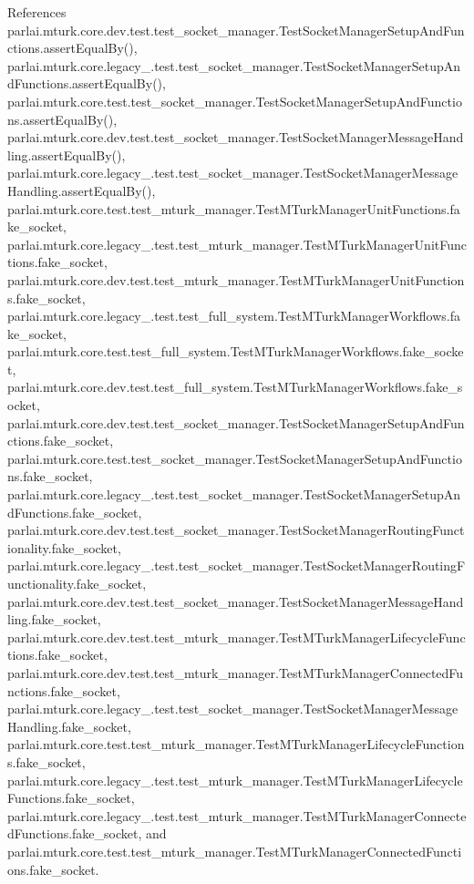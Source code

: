 References parlai.\+mturk.\+core.\+dev.\+test.\+test\+\_\+socket\+\_\+manager.\+Test\+Socket\+Manager\+Setup\+And\+Functions.\+assert\+Equal\+By(), parlai.\+mturk.\+core.\+legacy\+\_.\+test.\+test\+\_\+socket\+\_\+manager.\+Test\+Socket\+Manager\+Setup\+And\+Functions.\+assert\+Equal\+By(), parlai.\+mturk.\+core.\+test.\+test\+\_\+socket\+\_\+manager.\+Test\+Socket\+Manager\+Setup\+And\+Functions.\+assert\+Equal\+By(), parlai.\+mturk.\+core.\+dev.\+test.\+test\+\_\+socket\+\_\+manager.\+Test\+Socket\+Manager\+Message\+Handling.\+assert\+Equal\+By(), parlai.\+mturk.\+core.\+legacy\+\_.\+test.\+test\+\_\+socket\+\_\+manager.\+Test\+Socket\+Manager\+Message\+Handling.\+assert\+Equal\+By(), parlai.\+mturk.\+core.\+test.\+test\+\_\+mturk\+\_\+manager.\+Test\+M\+Turk\+Manager\+Unit\+Functions.\+fake\+\_\+socket, parlai.\+mturk.\+core.\+legacy\+\_.\+test.\+test\+\_\+mturk\+\_\+manager.\+Test\+M\+Turk\+Manager\+Unit\+Functions.\+fake\+\_\+socket, parlai.\+mturk.\+core.\+dev.\+test.\+test\+\_\+mturk\+\_\+manager.\+Test\+M\+Turk\+Manager\+Unit\+Functions.\+fake\+\_\+socket, parlai.\+mturk.\+core.\+legacy\+\_.\+test.\+test\+\_\+full\+\_\+system.\+Test\+M\+Turk\+Manager\+Workflows.\+fake\+\_\+socket, parlai.\+mturk.\+core.\+test.\+test\+\_\+full\+\_\+system.\+Test\+M\+Turk\+Manager\+Workflows.\+fake\+\_\+socket, parlai.\+mturk.\+core.\+dev.\+test.\+test\+\_\+full\+\_\+system.\+Test\+M\+Turk\+Manager\+Workflows.\+fake\+\_\+socket, parlai.\+mturk.\+core.\+dev.\+test.\+test\+\_\+socket\+\_\+manager.\+Test\+Socket\+Manager\+Setup\+And\+Functions.\+fake\+\_\+socket, parlai.\+mturk.\+core.\+test.\+test\+\_\+socket\+\_\+manager.\+Test\+Socket\+Manager\+Setup\+And\+Functions.\+fake\+\_\+socket, parlai.\+mturk.\+core.\+legacy\+\_.\+test.\+test\+\_\+socket\+\_\+manager.\+Test\+Socket\+Manager\+Setup\+And\+Functions.\+fake\+\_\+socket, parlai.\+mturk.\+core.\+dev.\+test.\+test\+\_\+socket\+\_\+manager.\+Test\+Socket\+Manager\+Routing\+Functionality.\+fake\+\_\+socket, parlai.\+mturk.\+core.\+legacy\+\_.\+test.\+test\+\_\+socket\+\_\+manager.\+Test\+Socket\+Manager\+Routing\+Functionality.\+fake\+\_\+socket, parlai.\+mturk.\+core.\+dev.\+test.\+test\+\_\+socket\+\_\+manager.\+Test\+Socket\+Manager\+Message\+Handling.\+fake\+\_\+socket, parlai.\+mturk.\+core.\+dev.\+test.\+test\+\_\+mturk\+\_\+manager.\+Test\+M\+Turk\+Manager\+Lifecycle\+Functions.\+fake\+\_\+socket, parlai.\+mturk.\+core.\+dev.\+test.\+test\+\_\+mturk\+\_\+manager.\+Test\+M\+Turk\+Manager\+Connected\+Functions.\+fake\+\_\+socket, parlai.\+mturk.\+core.\+legacy\+\_.\+test.\+test\+\_\+socket\+\_\+manager.\+Test\+Socket\+Manager\+Message\+Handling.\+fake\+\_\+socket, parlai.\+mturk.\+core.\+test.\+test\+\_\+mturk\+\_\+manager.\+Test\+M\+Turk\+Manager\+Lifecycle\+Functions.\+fake\+\_\+socket, parlai.\+mturk.\+core.\+legacy\+\_.\+test.\+test\+\_\+mturk\+\_\+manager.\+Test\+M\+Turk\+Manager\+Lifecycle\+Functions.\+fake\+\_\+socket, parlai.\+mturk.\+core.\+legacy\+\_.\+test.\+test\+\_\+mturk\+\_\+manager.\+Test\+M\+Turk\+Manager\+Connected\+Functions.\+fake\+\_\+socket, and parlai.\+mturk.\+core.\+test.\+test\+\_\+mturk\+\_\+manager.\+Test\+M\+Turk\+Manager\+Connected\+Functions.\+fake\+\_\+socket.

